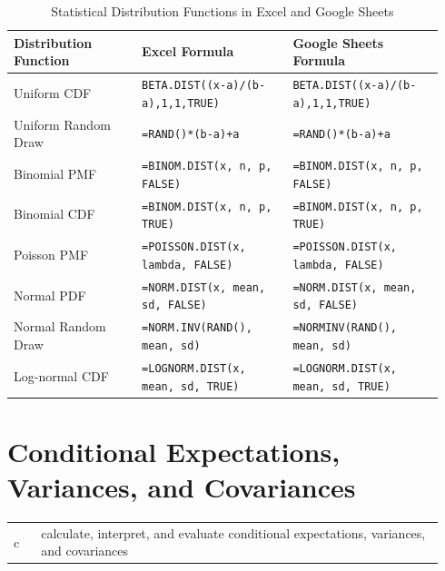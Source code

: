 \begin{table}[!htbp]
\centering
\renewcommand{\arraystretch}{1.5}
\caption{Statistical Distribution Functions in Excel and Google Sheets}
\label{tab:excel_formulas_m6}
\begin{tabular}{p{0.28\linewidth} p{0.33\linewidth} p{0.33\linewidth}}
\toprule
\textbf{Distribution Function} & \textbf{Excel Formula} & \textbf{Google Sheets Formula} \\
\midrule
Uniform CDF & \texttt{BETA.DIST((x-a)/(b-a),1,1,TRUE)} & \texttt{BETA.DIST((x-a)/(b-a),1,1,TRUE)} \\
Uniform Random Draw & \texttt{=RAND()*(b-a)+a} & \texttt{=RAND()*(b-a)+a} \\
Binomial PMF & \texttt{=BINOM.DIST(x, n, p, FALSE)} & \texttt{=BINOM.DIST(x, n, p, FALSE)} \\
Binomial CDF & \texttt{=BINOM.DIST(x, n, p, TRUE)} & \texttt{=BINOM.DIST(x, n, p, TRUE)} \\
Poisson PMF & \texttt{=POISSON.DIST(x, lambda, FALSE)} & \texttt{=POISSON.DIST(x, lambda, FALSE)} \\
Normal PDF & \texttt{=NORM.DIST(x, mean, sd, FALSE)} & \texttt{=NORM.DIST(x, mean, sd, FALSE)} \\
Normal Random Draw & \texttt{=NORM.INV(RAND(), mean, sd)} & \texttt{=NORMINV(RAND(), mean, sd)} \\
Log-normal CDF & \texttt{=LOGNORM.DIST(x, mean, sd, TRUE)} & \texttt{=LOGNORM.DIST(x, mean, sd, TRUE)} \\
\bottomrule
\end{tabular}
\end{table}

\section{Conditional Expectations, Variances, and Covariances}
\label{sec:Conditional Expectations, Variances, and Covariances}
\begin{center}
\begin{tabular}{p{0.06\linewidth} | p{0.88\linewidth}}
	c & calculate, interpret, and evaluate conditional expectations, variances, and covariances \\
\end{tabular}
\end{center}

